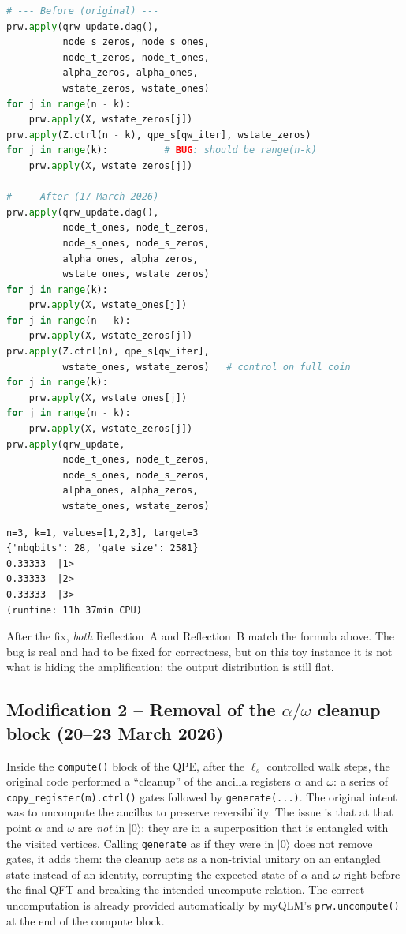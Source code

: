 \documentclass[11pt,a4paper]{article}
\begin{document}
\begin{lstlisting}[language=Python]
# --- Before (original) ---
prw.apply(qrw_update.dag(),
          node_s_zeros, node_s_ones,
          node_t_zeros, node_t_ones,
          alpha_zeros, alpha_ones,
          wstate_zeros, wstate_ones)
for j in range(n - k):
    prw.apply(X, wstate_zeros[j])
prw.apply(Z.ctrl(n - k), qpe_s[qw_iter], wstate_zeros)
for j in range(k):          # BUG: should be range(n-k)
    prw.apply(X, wstate_zeros[j])

# --- After (17 March 2026) ---
prw.apply(qrw_update.dag(),
          node_t_ones, node_t_zeros,
          node_s_ones, node_s_zeros,
          alpha_ones, alpha_zeros,
          wstate_ones, wstate_zeros)
for j in range(k):
    prw.apply(X, wstate_ones[j])
for j in range(n - k):
    prw.apply(X, wstate_zeros[j])
prw.apply(Z.ctrl(n), qpe_s[qw_iter],
          wstate_ones, wstate_zeros)   # control on full coin
for j in range(k):
    prw.apply(X, wstate_ones[j])
for j in range(n - k):
    prw.apply(X, wstate_zeros[j])
prw.apply(qrw_update,
          node_t_ones, node_t_zeros,
          node_s_ones, node_s_zeros,
          alpha_ones, alpha_zeros,
          wstate_ones, wstate_zeros)
\end{lstlisting}

\begin{lstlisting}[style=plain]
n=3, k=1, values=[1,2,3], target=3
{'nbqbits': 28, 'gate_size': 2581}
0.33333  |1>
0.33333  |2>
0.33333  |3>
(runtime: 11h 37min CPU)
\end{lstlisting}

After the fix, \emph{both} Reflection~A and Reflection~B match the
formula above. The bug is real and had to be fixed for correctness,
but on this toy instance it is not what is hiding the amplification:
the output distribution is still flat.

\subsection*{Modification 2 -- Removal of the
$\alpha/\omega$ cleanup block (20--23 March 2026)}

Inside the \texttt{compute()} block of the QPE, after the $\ell_s$
controlled walk steps, the original code performed a ``cleanup'' of
the ancilla registers $\alpha$ and $\omega$: a series of
\texttt{copy\_register(m).ctrl()} gates followed by
\texttt{generate(...)}. The original intent was to uncompute the
ancillas to preserve reversibility. The issue is that at that point
$\alpha$ and $\omega$ are \emph{not} in $|0\rangle$: they are in a
superposition that is entangled with the visited vertices. Calling
\texttt{generate} as if they were in $|0\rangle$ does not remove
gates, it adds them: the cleanup acts as a non-trivial unitary on an
entangled state instead of an identity, corrupting the expected
state of $\alpha$ and $\omega$ right before the final QFT and
breaking the intended uncompute relation. The correct uncomputation
is already provided automatically by myQLM's \texttt{prw.uncompute()}
at the end of the compute block.
\end{document}
